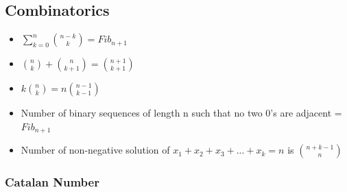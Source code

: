 \subsection{Combinatorics}

\begin{itemize}
  \setlength{\itemsep}{0.2ex}
  \setlength{\topsep}{0.3ex}
  \setlength{\parsep}{0pt}
  \setlength{\partopsep}{0pt}
    \item \begin{math}
        \sum\limits_{k =0}^n\binom{n-k}{k} = Fib_{n+1}
    \end{math}

    \item \begin{math}
        \binom{n}{k} + \binom{n}{k+1} = \binom{n+1}{k+1}
    \end{math}

    \item \begin{math}
        k \binom{n}{k}  = n\binom{n-1}{k-1}
    \end{math}
    \item Number of binary sequences of length n such that no two 0's are adjacent = $Fib_{n+1}$
    \item Number of non-negative solution of $x_1 + x_2 + x_3 + ... + x_k = n$ is $\binom{n+k-1}{n}$
\end{itemize}
\subsubsection{Catalan Number}

